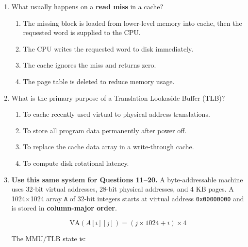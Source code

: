 \documentclass[a4paper,12pt]{article}
\begin{document}
\begin{enumerate}[label=\textbf{\arabic*.}]
    \item What usually happens on a \textbf{read miss} in a cache?
    \begin{enumerate}[label=\alph*)]
        \item The missing block is loaded from lower-level memory into cache, then the requested word is supplied to the CPU.
        \item The CPU writes the requested word to disk immediately.
        \item The cache ignores the miss and returns zero.
        \item The page table is deleted to reduce memory usage.
    \end{enumerate}

    \item What is the primary purpose of a Translation Lookaside Buffer (TLB)?
    \begin{enumerate}[label=\alph*)]
        \item To cache recently used virtual-to-physical address translations.
        \item To store all program data permanently after power off.
        \item To replace the cache data array in a write-through cache.
        \item To compute disk rotational latency.
    \end{enumerate}

    \item \textbf{Use this same system for Questions 11--20.} A byte-addressable machine uses 32-bit virtual addresses, 28-bit physical addresses, and 4 KB pages. A 1024$\times$1024 array \texttt{A} of 32-bit integers starts at virtual address \texttt{0x00000000} and is stored in \textbf{column-major order}.

    \[
        \text{VA}(A[i][j]) = (j \times 1024 + i) \times 4
    \]

    The MMU/TLB state is:


\end{enumerate}
\end{document}
